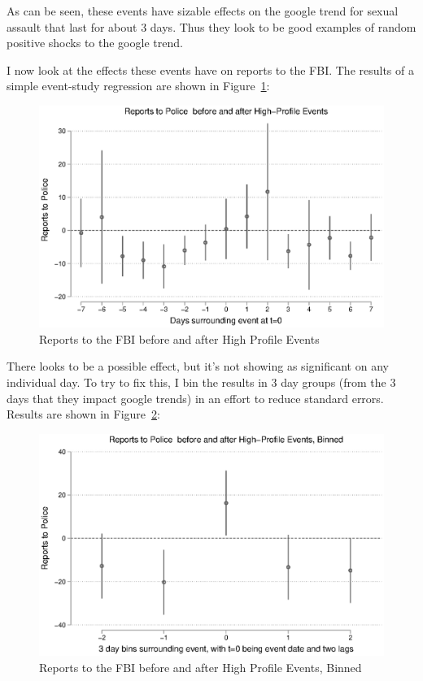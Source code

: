 \documentclass[AER,draftmode]{AEA}
\begin{document}
As can be seen, these events have sizable effects on the google trend for sexual assault that last for about 3 days. Thus they look to be good examples of random positive shocks to the google trend. 

I now look at the effects these events have on reports to the FBI. The results of a simple event-study regression are shown in Figure~\ref{figure:events_police}:

\begin{figure}
\includegraphics[width=\linewidth]{figures/events_police.eps}
\caption{Reports to the FBI before and after High Profile Events} \label{figure:events_police}
\end{figure}

There looks to be a possible effect, but it's not showing as significant on any individual day. To try to fix this, I bin the results in 3 day groups (from the 3 days that they impact google trends) in an effort to reduce standard errors. Results are shown in Figure~\ref{figure:events_police_binned}:

\begin{figure}
\includegraphics[width=\linewidth]{figures/events_police_binned.eps}
\caption{Reports to the FBI before and after High Profile Events, Binned} \label{figure:events_police_binned}
\end{figure}
\end{document}
